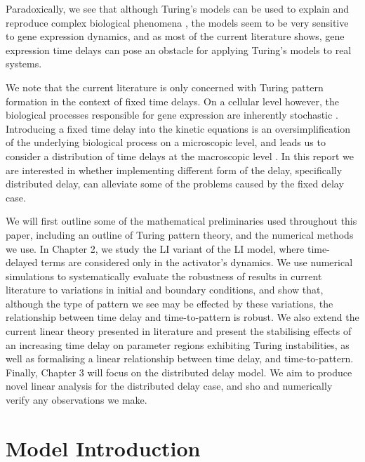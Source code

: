 Paradoxically, we see that although Turing's models can be used to explain and reproduce complex biological phenomena \cite{leegaffney}, the models seem to be very sensitive to gene expression dynamics, and as most of the current literature shows, gene expression time delays can pose an obstacle for applying Turing's models to real systems.

We note that the current literature is only concerned with Turing pattern formation in the context of fixed time delays. On a cellular level however, the biological processes responsible for gene expression are inherently stochastic \cite{raj,elowitz,mcadams,paulsson}. Introducing a fixed time delay into the kinetic equations is an oversimplification of the underlying biological process on a microscopic level, and leads us to consider a distribution of time delays at the macroscopic level \cite{bratsun,krausenew}. In this report we are interested in whether implementing different form of the delay, specifically distributed delay, can alleviate some of the problems caused by the fixed delay case.

We will first outline some of the mathematical preliminaries used throughout this paper, including an outline of Turing pattern theory, and the numerical methods we use. In Chapter 2, we study the LI variant of the LI model, where time-delayed terms are considered only in the activator's dynamics. We use numerical simulations to systematically evaluate the robustness of results in current literature to variations in initial and boundary conditions, and show that, although the type of pattern we see may be effected by these variations, the relationship between time delay and time-to-pattern is robust. We also extend the current linear theory presented in literature and present the stabilising effects of an increasing time delay on parameter regions exhibiting Turing instabilities, as well as formalising a linear relationship between time delay, and time-to-pattern. Finally, Chapter 3 will focus on the distributed delay model. We aim to produce novel linear analysis for the distributed delay case, and sho and numerically verify any observations we make.

\section{Model Introduction}
